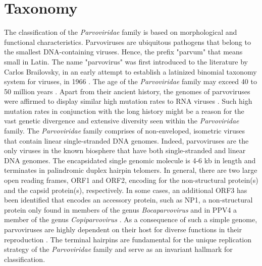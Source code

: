 



\section{Taxonomy}
\label{sec:Taxonomy}
The classification of the \textit{Parvoviridae} family is based on morphological and functional characteristics. Parvoviruses are ubiquitous pathogens that belong to the smallest DNA-containing viruses. Hence, the prefix "parvum" that means small in Latin. The name "parvovirus" was first introduced to the literature by Carlos Brailovsky, in an early attempt to establish a latinized binomial taxonomy system for viruses, in 1966 \cite{pmid5902774}. The age of the \textit{Parvoviridae} family may exceed 40 to 50 million years \cite{pmid20861255}. Apart from their ancient history, the genomes of parvoviruses were affirmed to display similar high mutation rates to RNA viruses \cite{pmid1649336, pmid12716974, pmid10411508, pmid16537636, pmid15626758, pmid21795474}. Such high mutation rates in conjunction with the long history might be a reason for the vast genetic divergence and extensive diversity seen within the \textit{Parvoviridae} family.      
The \textit{Parvoviridae} family comprises of non-enveloped, isometric viruses that contain linear single-stranded DNA genomes. Indeed, parvoviruses are the only viruses in the known biosphere that have both single-stranded and linear DNA genomes. The encapsidated single genomic molecule is 4-6 kb in length and terminates in palindromic duplex hairpin telomers. In general, there are two large open reading frames, ORF1 and ORF2, encoding for the non-structural protein(s) and the capsid protein(s), respectively. In some cases, an additional ORF3 has been identified that encodes an accessory protein, such as NP1, a non-structural protein only found in members of the genus \textit{Bocaparvovirus} and in PPV4 a member of the genus \textit{Copiparvovirus} \cite{pmid6319731, pmid21049037, pmid20339886}. As a consequence of such a simple genome, parvoviruses are highly dependent on their host for diverse functions in their reproduction \cite{pmid3296697, pmid10497831}. The terminal hairpins are fundamental for the unique replication strategy of the \textit{Parvoviridae} family and serve as an invariant hallmark for classification.
